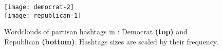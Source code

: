 
\begin{figure}[tbp]
	\centering
	\newcommand\mywidth{0.45}
	\texttt{[image: democrat-2]} %
	\vspace{0.1cm}\\
	\texttt{[image: republican-1]}
	\caption{
		Wordclouds of partisan hashtags in \debate: Democrat \textbf{(top)} and Republican \textbf{(bottom)}.
		Hashtags sizes are scaled by their frequency.
	}
	\label{fig:wordclouds}
\end{figure}